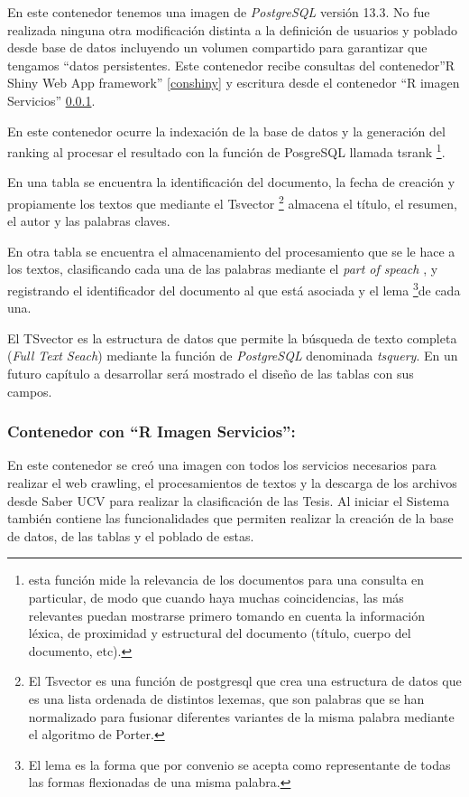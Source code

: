\documentclass[
  10,
  spanish,
  openany]{book}
\begin{document}
En este contenedor tenemos una imagen de \emph{PostgreSQL} versión 13.3. No fue realizada ninguna otra modificación distinta a la definición de usuarios y poblado desde base de datos incluyendo un volumen compartido para garantizar que tengamos ``datos persistentes. Este contenedor recibe consultas del contenedor''R Shiny Web App framework'' \ref{conshiny} y escritura desde el contenedor ``R imagen Servicios'' \ref{conservicios}.

En este contenedor ocurre la indexación de la base de datos y la generación del ranking al procesar el resultado con la función de PosgreSQL llamada tsrank \footnote{esta función mide la relevancia de los documentos para una consulta en particular, de modo que cuando haya muchas coincidencias, las más relevantes puedan mostrarse primero tomando en cuenta la información léxica, de proximidad y estructural del documento (título, cuerpo del documento, etc).}.

En una tabla se encuentra la identificación del documento, la fecha de creación y propiamente los textos que mediante el Tsvector \footnote{El Tsvector es una función de postgresql que crea una estructura de datos que es una lista ordenada de distintos lexemas, que son palabras que se han normalizado para fusionar diferentes variantes de la misma palabra mediante el algoritmo de Porter.} almacena el título, el resumen, el autor y las palabras claves.

En otra tabla se encuentra el almacenamiento del procesamiento que se le hace a los textos, clasificando cada una de las palabras mediante el \emph{part of speach} , y registrando el identificador del documento al que está asociada y el lema \footnote{El lema es la forma que por convenio se acepta como representante de todas las formas flexionadas de una misma palabra.}de cada una.

El TSvector es la estructura de datos que permite la búsqueda de texto completa (\emph{Full Text Seach}) mediante la función de \emph{PostgreSQL} denominada \emph{tsquery}. En un futuro capítulo a desarrollar será mostrado el diseño de las tablas con sus campos.

\hypertarget{conservicios}{%
\subsubsection{Contenedor con ``R Imagen Servicios'':}\label{conservicios}}

En este contenedor se creó una imagen con todos los servicios necesarios para realizar el web crawling, el procesamientos de textos y la descarga de los archivos desde Saber UCV para realizar la clasificación de las Tesis. Al iniciar el Sistema también contiene las funcionalidades que permiten realizar la creación de la base de datos, de las tablas y el poblado de estas.
\end{document}
